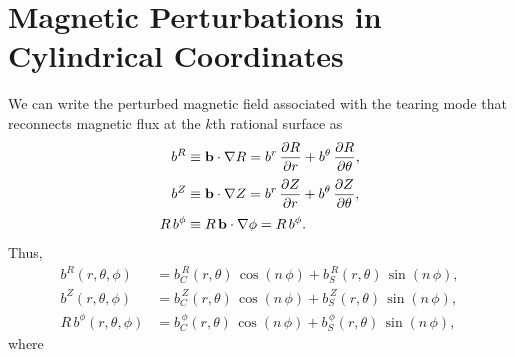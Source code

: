 \documentclass[12pt,prb,aps,notitlepage]{revtex4-1}
\begin{document}
\section{Magnetic Perturbations in Cylindrical Coordinates}
We can write the perturbed magnetic field associated with the tearing mode that reconnects magnetic flux at the $k$th rational surface as
\begin{align}
b^R &\equiv {\bf b}\cdot\nabla R = b^r\,\frac{\partial R}{\partial r}+ b^\theta\,\frac{\partial R}{\partial\theta},\\[0.5ex]
b^Z &\equiv {\bf b}\cdot\nabla Z = b^r\,\frac{\partial Z}{\partial r}+ b^\theta\,\frac{\partial Z}{\partial\theta},\\[0.5ex]
R\,b^\phi&\equiv R\,{\bf b}\cdot\nabla\phi = R\,b^\phi.
\end{align}
Thus,
\begin{align}
b^R(r,\theta,\phi) &= b^{\,R}_C(r,\theta)\,\cos(n\,\phi) + b_S^{\,R}(r,\theta)\,\sin(n\,\phi),\\[0.5ex]
b^Z(r,\theta,\phi) &= b^{\,Z}_C(r,\theta)\,\cos(n\,\phi) + b_S^{\,Z}(r,\theta)\,\sin(n\,\phi),\\[0.5ex]
R\,b^\phi(r,\theta,\phi) &= b^{\,\phi}_C(r,\theta)\,\cos(n\,\phi) + b_S^{\,\phi}(r,\theta)\,\sin(n\,\phi),
\end{align}
where
\end{document}
